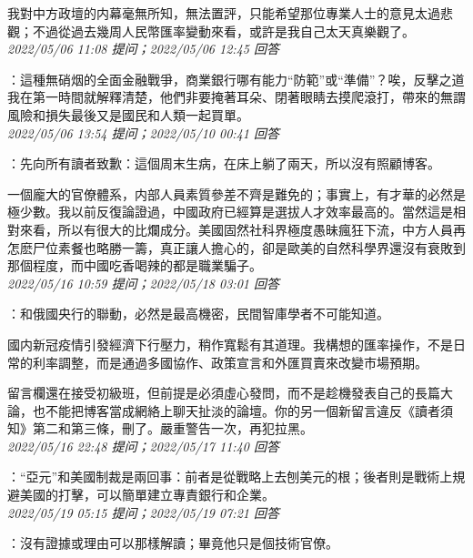 \documentclass[twocolumn]{ctexart}
\begin{document}
我對中方政壇的内幕毫無所知，無法置評，只能希望那位專業人士的意見太過悲觀；不過從過去幾周人民幣匯率變動來看，或許是我自己太天真樂觀了。
\\

\textit{\hfill\noindent\small 2022/05/06 11:08 提问；2022/05/06 12:45 回答}

：這種無硝烟的全面金融戰爭，商業銀行哪有能力“防範”或“準備”？唉，反擊之道我在第一時間就解釋清楚，他們非要掩著耳朵、閉著眼睛去摸爬滾打，帶來的無謂風險和損失最後又是國民和人類一起買單。
\\

\textit{\hfill\noindent\small 2022/05/06 13:54 提问；2022/05/10 00:41 回答}

：先向所有讀者致歉：這個周末生病，在床上躺了兩天，所以沒有照顧博客。

一個龐大的官僚體系，内部人員素質參差不齊是難免的；事實上，有才華的必然是極少數。我以前反復論證過，中國政府已經算是選拔人才效率最高的。當然這是相對來看，所以有很大的比爛成分。美國固然社科界極度愚昧瘋狂下流，中方人員再怎麽尸位素餐也略勝一籌，真正讓人擔心的，卻是歐美的自然科學界還沒有衰敗到那個程度，而中國吃香喝辣的都是職業騙子。
\\

\textit{\hfill\noindent\small 2022/05/16 10:59 提问；2022/05/18 03:01 回答}

：和俄國央行的聯動，必然是最高機密，民間智庫學者不可能知道。

國内新冠疫情引發經濟下行壓力，稍作寬鬆有其道理。我構想的匯率操作，不是日常的利率調整，而是通過多國協作、政策宣言和外匯買賣來改變市場預期。


留言欄還在接受初級班，但前提是必須虛心發問，而不是趁機發表自己的長篇大論，也不能把博客當成網絡上聊天扯淡的論壇。你的另一個新留言違反《讀者須知》第二和第三條，刪了。嚴重警告一次，再犯拉黑。
\\

\textit{\hfill\noindent\small 2022/05/16 22:48 提问；2022/05/17 11:40 回答}

：“亞元”和美國制裁是兩回事：前者是從戰略上去刨美元的根；後者則是戰術上規避美國的打擊，可以簡單建立專責銀行和企業。
\\

\textit{\hfill\noindent\small 2022/05/19 05:15 提问；2022/05/19 07:21 回答}

：沒有證據或理由可以那樣解讀；畢竟他只是個技術官僚。
\\
\end{document}
